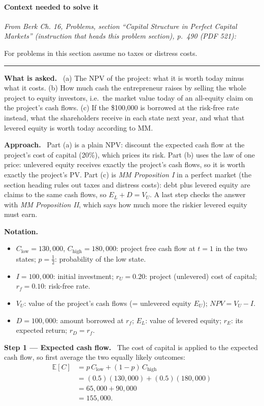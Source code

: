 \documentclass[11pt,a4paper]{article}
\numberwithin{equation}{section}
\newcommand{\notation}{\par\smallskip\noindent\textbf{Notation.}}
\newcommand{\step}[2]{\par\smallskip\noindent\textbf{Step #1 --- #2.}~}
\newcommand{\asked}{\par\medskip\noindent\textbf{What is asked.}~}
\newcommand{\approach}{\par\smallskip\noindent\textbf{Approach.}~}
\newcommand{\E}{\mathbb{E}}
\newcommand{\stmtend}{\par\endgroup\nopagebreak\noindent\rule{\linewidth}{0.4pt}\par\medskip}
\begin{document}
\paragraph{Context needed to solve it}

\emph{From Berk Ch. 16, Problems, section ``Capital Structure in Perfect Capital Markets''
(instruction that heads this problem section), p.~490 (PDF 521):}

For problems in this section assume no taxes or distress costs.
\stmtend

\asked
(a) The NPV of the project: what it is worth today minus what it costs.
(b) How much cash the entrepreneur raises by selling the whole project to equity investors, i.e.\
the market value today of an all-equity claim on the project's cash flows.
(c) If the \$100{,}000 is borrowed at the risk-free rate instead, what the shareholders receive
in each state next year, and what that levered equity is worth today according to MM.

\approach
Part (a) is a plain NPV: discount the expected cash flow at the project's cost of capital
(20\%), which prices its risk. Part (b) uses the law of one price: unlevered equity receives
exactly the project's cash flows, so it is worth exactly the project's PV. Part (c) is
\emph{MM Proposition I} in a perfect market (the section heading rules out taxes and distress
costs): debt plus levered equity are claims to the same cash flows, so $E_L+D=V_U$. A last
step checks the answer with \emph{MM Proposition II}, which says how much more the riskier
levered equity must earn.

\notation
\begin{itemize}
  \item $C_{\text{low}}=130{,}000$, $C_{\text{high}}=180{,}000$: project free cash flow at $t=1$ in the two states; $p=\tfrac12$: probability of the low state.
  \item $I=100{,}000$: initial investment; $r_U=0.20$: project (unlevered) cost of capital; $r_f=0.10$: risk-free rate.
  \item $V_U$: value of the project's cash flows (= unlevered equity $E_U$); $\mathit{NPV}=V_U-I$.
  \item $D=100{,}000$: amount borrowed at $r_f$; $E_L$: value of levered equity; $r_E$: its expected return; $r_D=r_f$.
\end{itemize}

\step{1}{Expected cash flow} The cost of capital is applied to the expected cash flow, so first
average the two equally likely outcomes:
\begin{align}
  \E[C] &= p\,C_{\text{low}}+(1-p)\,C_{\text{high}} \label{eq:1EC}\\
        &= (0.5)(130{,}000)+(0.5)(180{,}000) \nonumber\\
        &= 65{,}000+90{,}000 \nonumber\\
        &= 155{,}000. \nonumber
\end{align}
\end{document}

